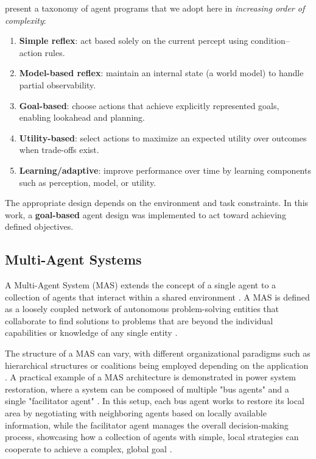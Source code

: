         \citet{Russell2020} present a taxonomy of agent programs that we adopt here in \textit{increasing order of complexity}:
        \begin{enumerate}[label=(\alph*)]
            \item \textbf{Simple reflex}: act based solely on the current percept using condition–action rules.
            \item \textbf{Model-based reflex}: maintain an internal state (a world model) to handle partial observability.
            \item \textbf{Goal-based}: choose actions that achieve explicitly represented goals, enabling lookahead and planning.
            \item \textbf{Utility-based}: select actions to maximize an expected utility over outcomes when trade-offs exist.
            \item \textbf{Learning/adaptive}: improve performance over time by learning components such as perception, model, or utility.
        \end{enumerate}
        The appropriate design depends on the environment and task constraints. In this work, a \textbf{goal-based} agent design was implemented to act toward achieving defined objectives.


        \subsection{Multi-Agent Systems}

            A Multi-Agent System (MAS) extends the concept of a single agent to a collection of agents that interact within a shared environment \citep{Gokulan2010}. A MAS is defined as a loosely coupled network of autonomous problem-solving entities that collaborate to find solutions to problems that are beyond the individual capabilities or knowledge of any single entity \citep{FloresMendez1999}. 

            The structure of a MAS can vary, with different organizational paradigms such as hierarchical structures or coalitions being employed depending on the application \citep{Gokulan2010}. A practical example of a MAS architecture is demonstrated in power system restoration, where a system can be composed of multiple "bus agents" and a single "facilitator agent" \citep{Nagata2002}. In this setup, each bus agent works to restore its local area by negotiating with neighboring agents based on locally available information, while the facilitator agent manages the overall decision-making process, showcasing how a collection of agents with simple, local strategies can cooperate to achieve a complex, global goal \citep{Nagata2002}.



